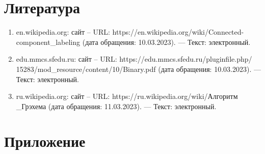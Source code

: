 \documentclass[14pt, russian]{extarticle}
\begin{document}
	\newpage
	
	\section{Литература}
	\begin{enumerate}
		\item en.wikipedia.org: сайт – URL: https://en.wikipedia.org/wiki/Connected-component\_labeling (дата обращения: 10.03.2023). —  Текст: электронный.
		\item edu.mmcs.sfedu.ru: сайт – URL: https://edu.mmcs.sfedu.ru/pluginfile.php/\\15283/mod\_resource/content/10/Binary.pdf (дата обращения: 10.03.2023). —  Текст: электронный.
		\item ru.wikipedia.org: сайт – URL: https://ru.wikipedia.org/wiki/Алгоритм\\\_Грэхема (дата обращения: 11.03.2023). —  Текст: электронный.
	\end{enumerate}
	\newpage
	
	\section{Приложение}
	
\end{document}
